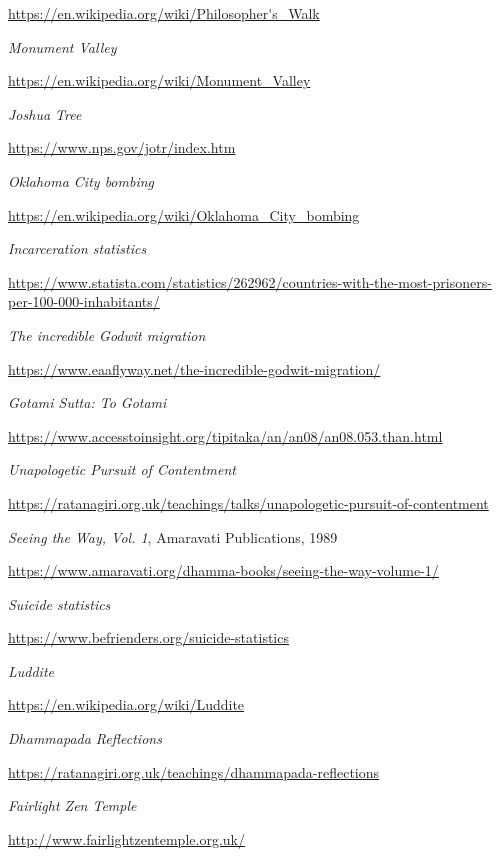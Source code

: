 \begin{thebibliography}{9}
  {\urlsize \url{https://en.wikipedia.org/wiki/Philosopher's_Walk}}

 \emph{Monument Valley}

  {\urlsize \url{https://en.wikipedia.org/wiki/Monument_Valley}}

 \emph{Joshua Tree}

  {\urlsize \url{https://www.nps.gov/jotr/index.htm}}

 \emph{Oklahoma City bombing}

  {\urlsize \url{https://en.wikipedia.org/wiki/Oklahoma_City_bombing}}

 \emph{Incarceration statistics}

  {\urlsize \url{https://www.statista.com/statistics/262962/countries-with-the-most-prisoners-per-100-000-inhabitants/}}

 \emph{The incredible Godwit migration}

  {\urlsize \url{https://www.eaaflyway.net/the-incredible-godwit-migration/}}

 \emph{Gotami Sutta: To Gotami}

  {\urlsize \url{https://www.accesstoinsight.org/tipitaka/an/an08/an08.053.than.html}}

 \emph{Unapologetic Pursuit of Contentment}

  {\urlsize \url{https://ratanagiri.org.uk/teachings/talks/unapologetic-pursuit-of-contentment}}

 \emph{Seeing the Way, Vol. 1}, Amaravati Publications, 1989

  {\urlsize \url{https://www.amaravati.org/dhamma-books/seeing-the-way-volume-1/}}

 \emph{Suicide statistics}

  {\urlsize \url{https://www.befrienders.org/suicide-statistics}}

 \emph{Luddite}

  {\urlsize \url{https://en.wikipedia.org/wiki/Luddite}}

 \emph{Dhammapada Reflections}

  {\urlsize \url{https://ratanagiri.org.uk/teachings/dhammapada-reflections}}

 \emph{Fairlight Zen Temple}

  {\urlsize \url{http://www.fairlightzentemple.org.uk/}}


\end{thebibliography}
